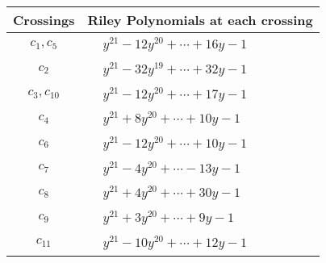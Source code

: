 \documentclass[1p]{elsarticle_modified}
\theoremstyle{definition}
\begin{document}
\begin{tabular}{m{50pt}|m{274pt}}
Crossings & \hspace{64pt}Riley Polynomials at each crossing \\
\hline $$\begin{aligned}c_{1},c_{5}\end{aligned}$$&$\begin{aligned}
&y^{21}-12 y^{20}+\cdots+16 y-1
\end{aligned}$\\
\hline $$\begin{aligned}c_{2}\end{aligned}$$&$\begin{aligned}
&y^{21}-32 y^{19}+\cdots+32 y-1
\end{aligned}$\\
\hline $$\begin{aligned}c_{3},c_{10}\end{aligned}$$&$\begin{aligned}
&y^{21}-12 y^{20}+\cdots+17 y-1
\end{aligned}$\\
\hline $$\begin{aligned}c_{4}\end{aligned}$$&$\begin{aligned}
&y^{21}+8 y^{20}+\cdots+10 y-1
\end{aligned}$\\
\hline $$\begin{aligned}c_{6}\end{aligned}$$&$\begin{aligned}
&y^{21}-12 y^{20}+\cdots+10 y-1
\end{aligned}$\\
\hline $$\begin{aligned}c_{7}\end{aligned}$$&$\begin{aligned}
&y^{21}-4 y^{20}+\cdots-13 y-1
\end{aligned}$\\
\hline $$\begin{aligned}c_{8}\end{aligned}$$&$\begin{aligned}
&y^{21}+4 y^{20}+\cdots+30 y-1
\end{aligned}$\\
\hline $$\begin{aligned}c_{9}\end{aligned}$$&$\begin{aligned}
&y^{21}+3 y^{20}+\cdots+9 y-1
\end{aligned}$\\
\hline $$\begin{aligned}c_{11}\end{aligned}$$&$\begin{aligned}
&y^{21}-10 y^{20}+\cdots+12 y-1
\end{aligned}$\\
\hline
\end{tabular}\\~\\
\end{document}
